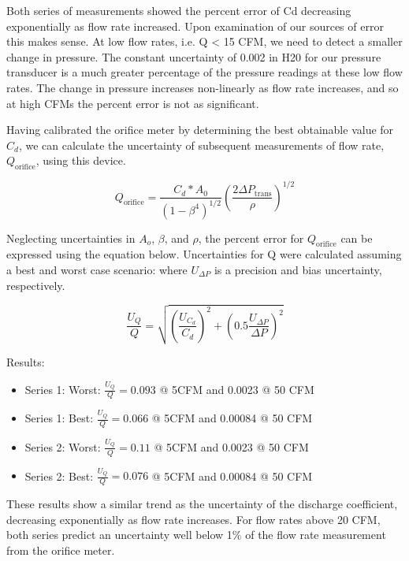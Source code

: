 \documentclass{article}
\begin{document}
Both series of measurements showed the percent error of Cd decreasing exponentially as flow 
rate increased. Upon examination of our sources of error this makes sense. At low flow rates, i.e. Q < 15 
CFM, we need to detect a smaller change in pressure. The constant uncertainty of 0.002 in H20 for our 
pressure transducer is a much greater percentage of the pressure readings at these low flow rates. The 
change in pressure increases non-linearly as flow rate increases, and so at high CFMs the percent error is 
not as significant.

Having calibrated the orifice meter by determining the best obtainable value for $C_d$, we can 
calculate the uncertainty of subsequent measurements of flow rate, $Q_{\text{orifice}}$, using this device.

\begin{equation}
  Q_{\text{orifice}} = \frac{C_d * A_0}{(1-\beta^4)^{1/2}} \left(\frac{2 \Delta P_{\text{trans}}}{\rho}\right)^{1/2}
\end{equation}

Neglecting uncertainties in $A_o$, $\beta$, and $\rho$, the percent error for $Q_{\text{orifice}}$ 
can be expressed using the equation below. Uncertainties for Q were calculated 
assuming a best and worst case scenario: where $U_{\Delta P}$ is a precision
 and bias uncertainty, respectively.

\begin{equation}
  \frac{U_{Q}}{Q} = \sqrt{ \left(\frac{U_{C_d}}{C_d}\right)^2 + \left( 0.5 \frac{U_{\Delta P}}{\Delta P} \right)^2}
\end{equation}

Results:
\begin{itemize}
\item Series 1: Worst: $\frac{U_Q}{Q} = 0.093$ @ 5CFM and 0.0023 @ 50 CFM
\item Series 1: Best:  $\frac{U_Q}{Q} = 0.066$ @ 5CFM and 0.00084 @ 50 CFM
\item Series 2: Worst: $\frac{U_Q}{Q} = 0.11$ @ 5CFM and 0.0023 @ 50 CFM
\item Series 2: Best:  $\frac{U_Q}{Q} = 0.076$ @ 5CFM and 0.00084 @ 50 CFM
\end{itemize}

These results show a similar trend as the uncertainty of the discharge coefficient, decreasing 
exponentially as flow rate increases. For flow rates above 20 CFM, both series predict an uncertainty 
well below 1\% of the flow rate measurement from the orifice meter.
\end{document}
